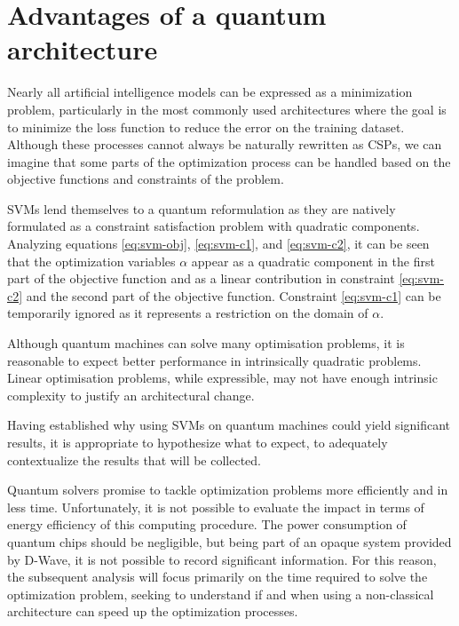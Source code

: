 \section{Advantages of a quantum architecture}

Nearly all artificial intelligence models can be expressed as a minimization problem, particularly in the most commonly used architectures where the goal is to minimize the loss function to reduce the error on the training dataset. Although these processes cannot always be naturally rewritten as CSPs, we can imagine that some parts of the optimization process can be handled based on the objective functions and constraints of the problem.

SVMs lend themselves to a quantum reformulation as they are natively formulated as a constraint satisfaction problem with quadratic components\cite{QSVM}. Analyzing equations \ref{eq:svm-obj}, \ref{eq:svm-c1}, and \ref{eq:svm-c2}, it can be seen that the optimization variables $\alpha$ appear as a quadratic component in the first part of the objective function and as a linear contribution in constraint \ref{eq:svm-c2} and the second part of the objective function. Constraint \ref{eq:svm-c1} can be temporarily ignored as it represents a restriction on the domain of $\alpha$.

Although quantum machines can solve many optimisation problems, it is reasonable to expect better performance in intrinsically quadratic problems. Linear optimisation problems, while expressible, may not have enough intrinsic complexity to justify an architectural change.

Having established why using SVMs on quantum machines could yield significant results, it is appropriate to hypothesize what to expect, to adequately contextualize the results that will be collected.

Quantum solvers promise to tackle optimization problems more efficiently and in less time. Unfortunately, it is not possible to evaluate the impact in terms of energy efficiency of this computing procedure. The power consumption of quantum chips should be negligible\cite{QPUefficiency}, but being part of an opaque system provided by D-Wave, it is not possible to record significant information. For this reason, the subsequent analysis will focus primarily on the time required to solve the optimization problem, seeking to understand if and when using a non-classical architecture can speed up the optimization processes.